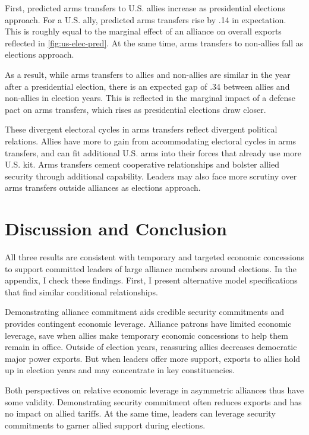 \documentclass[12pt]{article}
\begin{document}
First, predicted arms transfers to U.S. allies increase as presidential elections approach.
For a U.S. ally, predicted arms transfers rise by .14 in expectation. 
This is roughly equal to the marginal effect of an alliance on overall exports reflected in \autoref{fig:us-elec-pred}.
At the same time, arms transfers to non-allies fall as elections approach. 


As a result, while arms transfers to allies and non-allies are similar in the year after a presidential election, there is an expected gap of .34 between allies and non-allies in election years.
This is reflected in the marginal impact of a defense pact on arms transfers, which rises as presidential elections draw closer.


These divergent electoral cycles in arms transfers reflect divergent political relations.
Allies have more to gain from accommodating electoral cycles in arms transfers, and can fit additional U.S. arms into their forces that already use more U.S. kit.
Arms transfers cement cooperative relationships and bolster allied security through additional capability.
Leaders may also face more scrutiny over arms transfers outside alliances as elections approach. 




\section{Discussion and Conclusion}


All three results are consistent with temporary and targeted economic concessions to support committed leaders of large alliance members around elections. 
In the appendix, I check these findings.
First, I present alternative model specifications that find similar conditional relationships.


Demonstrating alliance commitment aids credible security commitments and provides contingent economic leverage. 
Alliance patrons have limited economic leverage, save when allies make temporary economic concessions to help them remain in office. 
Outside of election years, reassuring allies decreases democratic major power exports.
But when leaders offer more support, exports to allies hold up in election years and may concentrate in key constituencies.


Both perspectives on relative economic leverage in asymmetric alliances thus have some validity. 
Demonstrating security commitment often reduces exports and has no impact on allied tariffs. 
At the same time, leaders can leverage security commitments to garner allied support during elections. 
\end{document}
